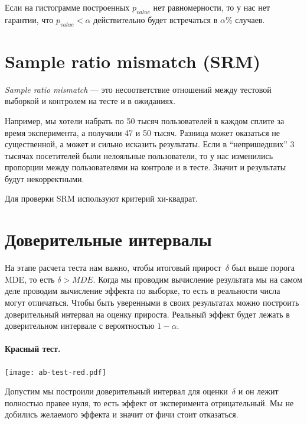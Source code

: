 \documentclass[../handbook.tex]{subfiles}
\begin{document}
Если на гистограмме построенных $p_{value}$ нет равномерности, то у нас нет
гарантии, что $p_{value} < \alpha$ действительно будет встречаться в $\alpha\%$
случаев.


\section{Sample ratio mismatch (SRM)}

\emph{Sample ratio mismatch} --- это несоответствие отношений между тестовой
выборкой и контролем на тесте и в ожиданиях.

Например, мы хотели набрать по 50 тысяч пользователей в каждом сплите за время
эксперимента, а получили 47 и 50 тысяч. Разница может оказаться не
существенной, а может и сильно исказить результаты. Если в ``непришедших'' 3
тысячах посетителей были нелояльные пользователи, то у нас изменились пропорции
между пользователями на контроле и в тесте. Значит и результаты будут
некорректными.

Для проверки SRM используют критерий хи-квадрат.

\section{Доверительные интервалы}
На этапе расчета теста нам важно, чтобы итоговый прирост~$\delta$ был выше
порога MDE, то есть $\delta > MDE$. Когда мы проводим вычисление результата мы на самом деле проводим
вычисление эффекта по выборке, то есть в реальности числа могут отличаться.
Чтобы быть уверенными в своих результатах можно построить доверительный
интервал на оценку прироста. Реальный эффект будет лежать в доверительном интервале с вероятностью $1 - \alpha$.

\paragraph{Красный тест.}
\begin{marginfigure}
    \texttt{[image: ab-test-red.pdf]}
\end{marginfigure}
Допустим мы построили доверительный интервал для оценки~$\delta$ и он лежит
полностью правее нуля, то есть эффект от эксперимента отрицательный. Мы не
добились желаемого эффекта и значит от фичи стоит отказаться.
\end{document}
